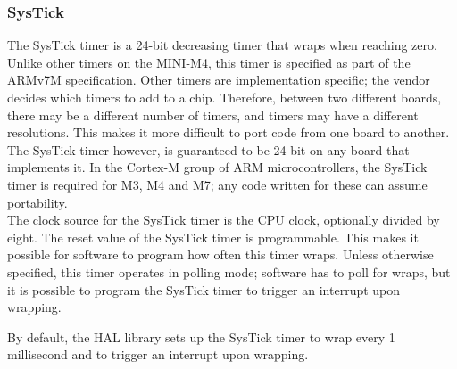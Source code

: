 \subsubsection{SysTick}
\label{sssec:systick}
The SysTick timer is a 24-bit decreasing timer that wraps when reaching zero.
Unlike other timers on the MINI-M4, this timer is specified as part of the ARMv7M
specification. Other timers are implementation specific; the vendor decides
which timers to add to a chip. Therefore, between two different boards, there
may be a different number of timers, and timers may have a different resolutions.
This makes it more difficult to port code from one board to another. The SysTick
timer however, is guaranteed to be 24-bit on any board that implements it. In the
Cortex-M group of ARM microcontrollers, the SysTick timer is required for M3, M4
and M7; any code written for these can assume portability.\\

The clock source for the SysTick timer is the CPU clock, optionally divided by
eight. The reset value of the SysTick timer is programmable. This makes it
possible for software to program how often this timer wraps.
Unless otherwise specified, this timer operates in polling mode; software has to
poll for wraps, but it is possible to program the SysTick timer to trigger an
interrupt upon wrapping.

By default, the HAL library sets up the SysTick timer to wrap every 1 millisecond
and to trigger an interrupt upon wrapping.


